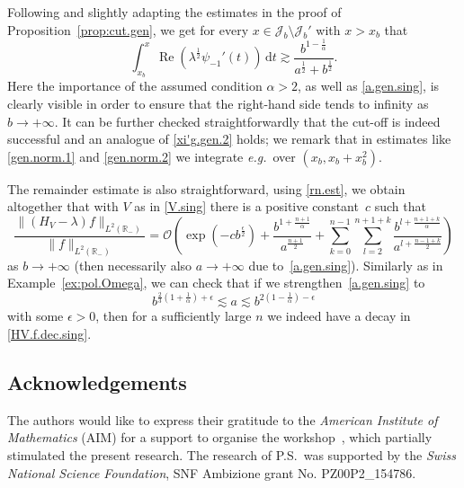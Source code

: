 \begin{Example}
Following and slightly adapting the estimates in the proof of Proposition~\ref{prop:cut.gen}, we get for every $x \in {\mathcal J}_b \setminus {\mathcal J}_b'$ with $x>x_b$ that 
\begin{equation}\label{general.-1est.sing}
\int_{x_b}^x{\operatorname{Re}} (\lambda^\frac 12 \psi_{-1}'(t)) \, {\mathrm{d}} t
{\gtrsim}
\frac{b^{1-\frac 1\alpha}}{a^\frac12 + b^\frac 12}.
\end{equation}
Here the importance of the assumed condition $\alpha>2$, 
as well as \eqref{a.gen.sing}, 
is clearly visible in order to ensure that the right-hand side tends to infinity as $b\to+\infty$. 
It can be further checked straightforwardly that the cut-off is indeed successful and an analogue of \eqref{xi'g.gen.2} holds; we remark that in estimates like 
\eqref{gen.norm.1} and \eqref{gen.norm.2} we integrate {\emph{e.g.}}~over $(x_b,x_b+x_b^2)$.

The remainder estimate is also straightforward, using \eqref{rn.est}, we obtain altogether that with $V$ as in \eqref{V.sing} there is a positive constant~$c$ such that
\begin{equation}\label{HV.f.dec.sing}
\frac{\|(H_V-\lambda) f\|_{L^2({\mathbb{R}}_-)}}{\|f\|_{L^2({\mathbb{R}}_-)}} 
= 
{\mathcal{O}} \left( \exp(-c b^\frac \epsilon 2 )
+ 
\frac{b^{1+\frac{n+1}{\alpha}}}{a^\frac{n+1}{2}} + \sum_{k=0}^{n-1}\sum_{l=2}^{n+1+k} \frac{b^{l+\frac{n+1+k}{\alpha}}}{a^{l+\frac{n-1+k}{2}}}
\right)
\end{equation}
as $b \to + \infty$ 
(then necessarily also $a \to +\infty$ due to~\eqref{a.gen.sing}).
Similarly as in Example~\ref{ex:pol.Omega}, 
we can check that if we strengthen~\eqref{a.gen.sing} to
\begin{equation}\label{a.gen.sing.dec}
b^{\frac 23(1+\frac 1\alpha)+\epsilon} {\lesssim} a  {\lesssim} b^{2(1-\frac 1\alpha)-\epsilon}
\end{equation}
with some $\epsilon>0$, then for a sufficiently large $n$ we indeed have a decay in \eqref{HV.f.dec.sing}.
\end{Example}

\subsection*{Acknowledgements}
The authors would like to express their gratitude to 
the \emph{American Institute of Mathematics} (AIM) for a support to organise
the workshop~\cite{AIM-2015}, which partially stimulated the present research.
The research of P.S.\ was supported by the \emph{Swiss National Science Foundation}, 
SNF Ambizione grant No. PZ00P2\_154786.





